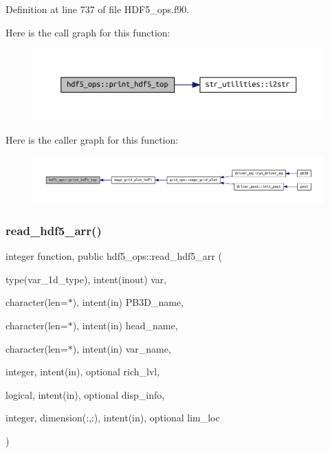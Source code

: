Definition at line 737 of file H\+D\+F5\+\_\+ops.\+f90.

Here is the call graph for this function\+:
\nopagebreak
\begin{figure}[H]
\begin{center}
\leavevmode
\includegraphics[width=350pt]{namespacehdf5__ops_af34b4aea64a8b67ec827aaf4a7425caf_cgraph}
\end{center}
\end{figure}
Here is the caller graph for this function\+:
\nopagebreak
\begin{figure}[H]
\begin{center}
\leavevmode
\includegraphics[width=350pt]{namespacehdf5__ops_af34b4aea64a8b67ec827aaf4a7425caf_icgraph}
\end{center}
\end{figure}
\mbox{\label{namespacehdf5__ops_a5108e0d6f6b492cb981505ebceedd9ee}} 
\subsubsection{\texorpdfstring{read\+\_\+hdf5\+\_\+arr()}{read\_hdf5\_arr()}}
{\footnotesize\ttfamily integer function, public hdf5\+\_\+ops\+::read\+\_\+hdf5\+\_\+arr (\begin{DoxyParamCaption}\item[{type(var\+\_\+1d\+\_\+type), intent(inout)}]{var,  }\item[{character(len=$\ast$), intent(in)}]{P\+B3\+D\+\_\+name,  }\item[{character(len=$\ast$), intent(in)}]{head\+\_\+name,  }\item[{character(len=$\ast$), intent(in)}]{var\+\_\+name,  }\item[{integer, intent(in), optional}]{rich\+\_\+lvl,  }\item[{logical, intent(in), optional}]{disp\+\_\+info,  }\item[{integer, dimension(\+:,\+:), intent(in), optional}]{lim\+\_\+loc }\end{DoxyParamCaption})}



